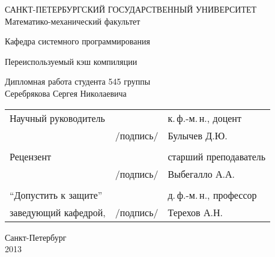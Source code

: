 %
%
\thispagestyle{empty}
\begin{center}
САНКТ-ПЕТЕРБУРГСКИЙ ГОСУДАРСТВЕННЫЙ УНИВЕРСИТЕТ\\
Математико-механический факультет\\
\end{center}

\begin{center}
Кафедра системного программирования\\
\end{center}
\vspace{2cm}
\begin{center}
    \LARGE{Переиспользуемый кэш компиляции} \\
\end{center}
\vspace{1cm}
\begin{center}
    \normalsize{Дипломная работа студента 545 группы} \\
    \large{Серебрякова Сергея Николаевича}
\end{center}
\vspace{3cm}
\noindent
\begin{center}
    \small
    \begin{tabular}{lcl}
        Научный руководитель & \dotuline{\phantom{место для подписи}} & к.\,ф.-м.\,н., доцент\\
        & /подпись/ & Булычев Д.Ю.\\\\
        Рецензент & \dotuline{\phantom{место для подписи}} & старший преподаватель\\
        & /подпись/& Выбегалло А.А.\\\\
        ``Допустить к защите'' & \dotuline{\phantom{место для подписи}} & д.\,ф.-м.\,н., профессор\\
        заведующий кафедрой, & /подпись/& Терехов А.Н.\\
    \end{tabular}
\end{center}
\vspace{\fill}
\begin{center}
    \small
    Санкт-Петербург\\2013
\end{center}
